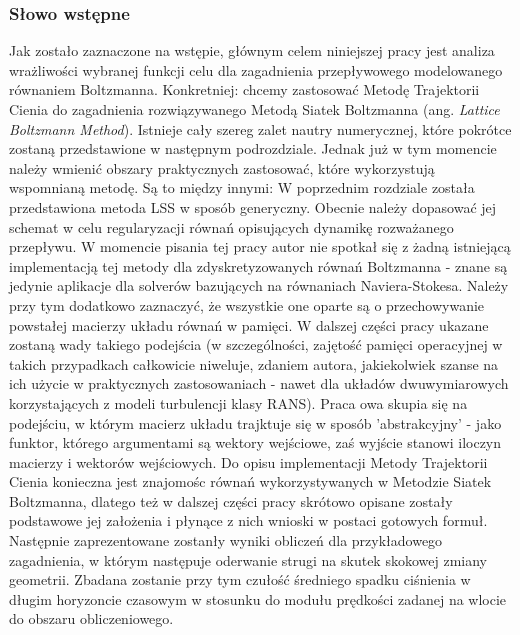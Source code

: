 \documentclass[12pt]{article}
\begin{document}
\subsubsection{Słowo wstępne}
Jak zostało zaznaczone na wstępie, głównym celem niniejszej pracy jest analiza wrażliwości wybranej funkcji celu dla zagadnienia przepływowego modelowanego równaniem Boltzmanna. Konkretniej: chcemy zastosować Metodę Trajektorii Cienia do zagadnienia rozwiązywanego Metodą Siatek Boltzmanna (ang. \textit{Lattice Boltzmann Method}). Istnieje cały szereg zalet nautry numerycznej, które pokrótce zostaną przedstawione w następnym podrozdziale. Jednak już w tym momencie należy wmienić obszary praktycznych zastosować, które wykorzystują wspomnianą metodę. Są to między innymi:
W poprzednim rozdziale została przedstawiona metoda LSS w sposób generyczny. Obecnie należy dopasować jej schemat w celu regularyzacji równań opisujących dynamikę rozważanego przepływu. W momencie pisania tej pracy autor nie spotkał się z żadną istniejącą implementacją tej metody dla zdyskretyzowanych równań Boltzmanna - znane są jedynie aplikacje dla solverów bazujących na równaniach Naviera-Stokesa. Należy przy tym dodatkowo zaznaczyć, że wszystkie one oparte są o przechowywanie powstałej macierzy układu równań w pamięci. W dalszej części pracy ukazane zostaną wady takiego podejścia (w szczególności, zajętość pamięci operacyjnej w takich przypadkach całkowicie niweluje, zdaniem autora, jakiekolwiek szanse na ich użycie w praktycznych zastosowaniach - nawet dla układów dwuwymiarowych korzystających z modeli turbulencji klasy RANS). Praca owa skupia się na podejściu, w którym macierz układu trajktuje się w sposób 'abstrakcyjny' - jako funktor, którego argumentami są wektory wejściowe, zaś wyjście stanowi iloczyn macierzy i wektorów wejściowych.
Do opisu implementacji Metody Trajektorii Cienia konieczna jest znajomośc równań wykorzystywanych w Metodzie Siatek Boltzmanna, dlatego też w dalszej części pracy skrótowo opisane zostały podstawowe jej założenia i płynące z nich wnioski w postaci gotowych formuł. Następnie zaprezentowane zostanły wyniki obliczeń dla przykładowego zagadnienia, w którym następuje oderwanie strugi na skutek skokowej zmiany geometrii. Zbadana zostanie przy tym czułość średniego spadku ciśnienia w długim horyzoncie czasowym w stosunku do modułu prędkości zadanej na wlocie do obszaru obliczeniowego.
\end{document}
